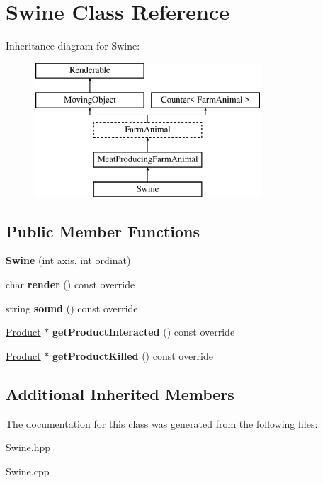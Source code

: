 \hypertarget{class_swine}{}\section{Swine Class Reference}
\label{class_swine}
Inheritance diagram for Swine\+:\begin{figure}[H]
\begin{center}
\leavevmode
\includegraphics[height=5.000000cm]{class_swine}
\end{center}
\end{figure}
\subsection*{Public Member Functions}
\begin{DoxyCompactItemize}
\item 
\mbox{\label{class_swine_a01cec0dd5be1c934ae0b69c32ba23611}} 
{\bfseries Swine} (int axis, int ordinat)
\item 
\mbox{\label{class_swine_a2c75aa06dedaafc6217f9b6bab00fe71}} 
char {\bfseries render} () const override
\item 
\mbox{\label{class_swine_acf7d690f23e301440608c7cb1b7eec91}} 
string {\bfseries sound} () const override
\item 
\mbox{\label{class_swine_abe8943afe38ff942d100a833f37626e3}} 
\mbox{\hyperlink{class_product}{Product}} $\ast$ {\bfseries get\+Product\+Interacted} () const override
\item 
\mbox{\label{class_swine_a630d14fa02644b4016a1be97006f017a}} 
\mbox{\hyperlink{class_product}{Product}} $\ast$ {\bfseries get\+Product\+Killed} () const override
\end{DoxyCompactItemize}
\subsection*{Additional Inherited Members}


The documentation for this class was generated from the following files\+:\begin{DoxyCompactItemize}
\item 
Swine.\+hpp\item 
Swine.\+cpp\end{DoxyCompactItemize}
